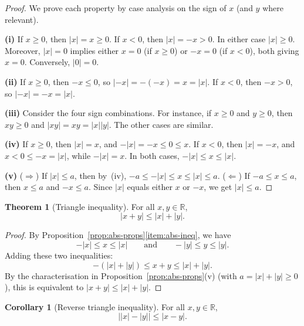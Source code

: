 \documentclass[12pt,a4paper,openany]{book}
\newcommand{\R}{\mathbb{R}}
\newcommand{\abs}[1]{\left\lvert #1 \right\rvert}
\theoremstyle{definition}
\newtheorem{theorem}{Theorem}[chapter]
\newtheorem{corollary}{Corollary}[chapter]
\theoremstyle{remark}
\begin{document}
\begin{proof}
We prove each property by case analysis on the sign of $x$ (and $y$ where
relevant).

\textbf{(i)} If $x \geq 0$, then $\abs{x}=x\geq 0$.  If $x<0$, then
$\abs{x}=-x>0$.  In either case $\abs{x}\geq 0$.  Moreover, $\abs{x}=0$
implies either $x=0$ (if $x\geq 0$) or $-x=0$ (if $x<0$), both giving $x=0$.
Conversely, $\abs{0}=0$.

\textbf{(ii)} If $x \geq 0$, then $-x \leq 0$, so
$\abs{-x}=-(-x)=x=\abs{x}$.  If $x < 0$, then $-x > 0$, so
$\abs{-x}=-x=\abs{x}$.

\textbf{(iii)} Consider the four sign combinations.  For instance, if
$x \geq 0$ and $y \geq 0$, then $xy \geq 0$ and
$\abs{xy}=xy=\abs{x}\abs{y}$.  The other cases are similar.

\textbf{(iv)} If $x \geq 0$, then $\abs{x}=x$, and $-\abs{x}=-x \leq 0
\leq x$.  If $x<0$, then $\abs{x}=-x$, and $x < 0 \leq -x = \abs{x}$,
while $-\abs{x}=x$.  In both cases, $-\abs{x}\leq x \leq \abs{x}$.

\textbf{(v)} ($\Rightarrow$) If $\abs{x}\leq a$, then by~(iv),
$-a \leq -\abs{x} \leq x \leq \abs{x} \leq a$.
($\Leftarrow$) If $-a\leq x \leq a$, then $x \leq a$ and $-x \leq a$.
Since $\abs{x}$ equals either $x$ or $-x$, we get $\abs{x}\leq a$.
\end{proof}

\begin{theorem}[Triangle inequality]\label{thm:triangle-ineq}
For all $x,y \in \R$,
\[
  \abs{x+y} \leq \abs{x} + \abs{y}.
\]
\end{theorem}

\begin{proof}
By Proposition~\ref{prop:abs-props}\ref{item:abs-ineq}, we have
\[
  -\abs{x} \leq x \leq \abs{x}
  \qquad\text{and}\qquad
  -\abs{y} \leq y \leq \abs{y}.
\]
Adding these two inequalities:
\[
  -(\abs{x}+\abs{y}) \leq x + y \leq \abs{x}+\abs{y}.
\]
By the characterisation in Proposition~\ref{prop:abs-props}(v) (with
$a = \abs{x}+\abs{y} \geq 0$), this is equivalent to
$\abs{x+y} \leq \abs{x}+\abs{y}$.
\end{proof}

\begin{corollary}[Reverse triangle inequality]\label{cor:reverse-triangle}
For all $x,y \in \R$,
\[
  \bigl|\abs{x}-\abs{y}\bigr| \leq \abs{x-y}.
\]
\end{corollary}
\end{document}
